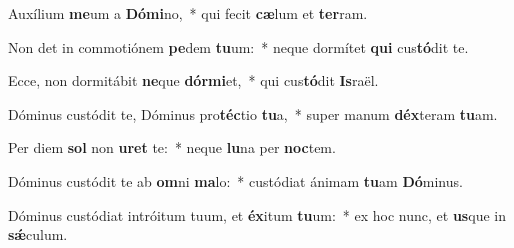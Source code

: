 \item Auxílium \textbf{me}um a \textbf{Dó}\textbf{mi}no,~* qui fecit \textbf{cæ}lum et \textbf{ter}ram.
\item Non det in commotiónem \textbf{pe}dem \textbf{tu}um:~* neque dormítet \textbf{qui} cus\textbf{tó}dit te.
\item Ecce, non dormitábit \textbf{ne}que \textbf{dór}\textbf{mi}et,~* qui cus\textbf{tó}dit \textbf{Is}raël.
\item Dóminus custódit te, Dóminus pro\textbf{téc}tio \textbf{tu}a,~* super manum \textbf{déx}teram \textbf{tu}am.
\item Per diem \textbf{sol} non \textbf{u}\textbf{ret} te:~* neque \textbf{lu}na per \textbf{noc}tem.
\item Dóminus custódit te ab \textbf{om}ni \textbf{ma}lo:~* custódiat ánimam \textbf{tu}am \textbf{Dó}minus.
\item Dóminus custódiat intróitum tuum, et \textbf{éx}itum \textbf{tu}um:~* ex hoc nunc, et \textbf{us}que in \textbf{sǽ}culum.
